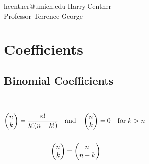 \documentclass[12pt]{article}
\renewcommand{\maketitle}{%
\begin {flushleft}{\fontsize{25pt}{33pt}\bfseries
\theauthor}}
\begin{document}
\author{Enumerative Combinatorics Exam Notes}
\date{\today}
\fancyhead{}

\maketitle

\vspace{.7em} %

\large{hcentner@umich.edu \hfill Harry Centner} \\
\hfill Professor Terrence George 


\end{flushleft}

\vspace{-1em}

\section{Coefficients}
\begin{center} \end{center}
\vspace{-1em}

	\subsection{Binomial Coefficients}
	\begin{center} \end{center}
	\begin{tcolorbox}
	\\
	
	\hfill
	\begin{center}
	$\begin{aligned}
	 \begin{pmatrix} n \\ k \end{pmatrix} = \frac{n!}{k!(n-k!)}\quad& \text{and}\quad \begin{pmatrix} n \\ k \end{pmatrix}  = 0 \quad \text{for $k >n$}\\
	 \hfill \\
	 \begin{pmatrix} n \\ k \end{pmatrix} &=  \begin{pmatrix} n \\ n-k \end{pmatrix} \\
	\end{aligned}$
	\end{center}
	\end{tcolorbox}
	
\end{document}
